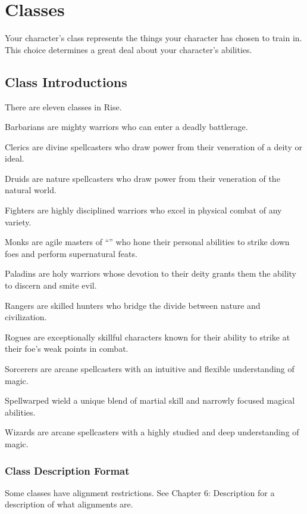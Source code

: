 \chapter{Classes}
Your character's class represents the things your character has chosen to train in. This choice determines a great deal about your character's abilities.

\section{Class Introductions}
There are eleven classes in Rise.
\begin{itemize*}
  \item Barbarians are mighty warriors who can enter a deadly battlerage.
  \item Clerics are divine spellcasters who draw power from their veneration of a deity or ideal.
  \item Druids are nature spellcasters who draw power from their veneration of the natural world.
  \item Fighters are highly disciplined warriors who excel in physical combat of any variety.
  \item Monks are agile masters of ``\ki'' who hone their personal abilities to strike down foes and perform supernatural feats.
  \item Paladins are holy warriors whose devotion to their deity grants them the ability to discern and smite evil.
  \item Rangers are skilled hunters who bridge the divide between nature and civilization.
  \item Rogues are exceptionally skillful characters known for their ability to strike at their foe's weak points in combat.
  \item Sorcerers are arcane spellcasters with an intuitive and flexible understanding of magic.
  \item Spellwarped wield a unique blend of martial skill and narrowly focused magical abilities.
  \item Wizards are arcane spellcasters with a highly studied and deep understanding of magic.
\end{itemize*}

\subsection{Class Description Format}

 Some classes have alignment restrictions. See Chapter 6: Description for a description of what alignments are.

